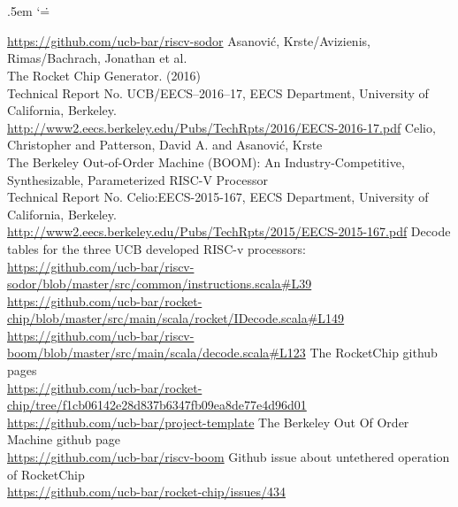 \documentclass[journal,a4paper]{IEEEtran}
\makeatletter
\renewenvironment{thebibliography}[1]{%
	\section*{\textsc{\refname}}%
	\normalfont\footnotesize\labelsep .5em\relax
	\renewcommand\theenumiv{\arabic{enumiv}}\let\p@enumiv\@empty
	\list{\@biblabel{\theenumiv}}{\@bibNote\settowidth\labelwidth{\@biblabel{#1}}%
	\leftmargin\labelwidth \advance\leftmargin\labelsep
	\usecounter{enumiv}}%
	\sloppy \clubpenalty\@M \widowpenalty\clubpenalty
	\sfcode`\.=\@m
}{%
	\def\@noitemerr{\@latex@warning{Empty `thebibliography' environment}}%
	\endlist
}
\makeatother
\begin{document}
\begin{thebibliography}{}
		\url{https://github.com/ucb-bar/riscv-sodor}
		\vspace*{0.9pt}
		Asanović, Krste/Avizienis, Rimas/Bachrach, Jonathan et al.\\
		The Rocket Chip Generator. (2016)\\
		Technical Report No. UCB/EECS--2016--17, EECS Department, University of California, Berkeley.\\
		\url{http://www2.eecs.berkeley.edu/Pubs/TechRpts/2016/EECS-2016-17.pdf}
		\vspace*{0.9pt}
		Celio, Christopher and Patterson, David A. and Asanović, Krste\\
		The Berkeley Out-of-Order Machine (BOOM): An Industry-Competitive, Synthesizable, Parameterized RISC-V Processor\\
		Technical Report No. Celio:EECS-2015-167, EECS Department, University of California, Berkeley.\\
		\url{http://www2.eecs.berkeley.edu/Pubs/TechRpts/2015/EECS-2015-167.pdf}
		\vspace*{0.9pt}
		Decode tables for the three UCB developed RISC-v processors:\\
		\url{https://github.com/ucb-bar/riscv-sodor/blob/master/src/common/instructions.scala#L39}\\
		\url{https://github.com/ucb-bar/rocket-chip/blob/master/src/main/scala/rocket/IDecode.scala#L149}\\
		\url{https://github.com/ucb-bar/riscv-boom/blob/master/src/main/scala/decode.scala#L123}
		\vspace*{0.9pt}
		The RocketChip github pages\\
		\url{https://github.com/ucb-bar/rocket-chip/tree/f1cb06142e28d837b6347fb09ea8de77e4d96d01}\\
		\url{https://github.com/ucb-bar/project-template}
		\vspace*{0.9pt}
		The Berkeley Out Of Order Machine github page\\
		\url{https://github.com/ucb-bar/riscv-boom}
		\vspace*{0.9pt}
		Github issue about untethered operation of RocketChip\\
		\url{https://github.com/ucb-bar/rocket-chip/issues/434}
		\vspace*{0.9pt}

\end{thebibliography}
\end{document}
